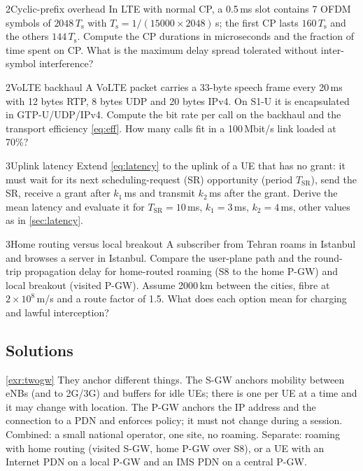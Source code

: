 \documentclass[11pt,a4paper]{article}
\begin{document}
\begin{exercisebox}{2}{Cyclic-prefix overhead}\label{exr:cp}
In LTE with normal CP, a 0.5\,ms slot contains 7 OFDM symbols of $2048\,T_\mathrm{s}$ with
$T_\mathrm{s} = 1/(15000\times2048)$\,s; the first CP lasts $160\,T_\mathrm{s}$ and the others
$144\,T_\mathrm{s}$. Compute the CP durations in microseconds and the fraction of time spent on
CP. What is the maximum delay spread tolerated without inter-symbol interference?
\end{exercisebox}

\begin{exercisebox}{2}{VoLTE backhaul}\label{exr:volte}
A VoLTE packet carries a 33-byte speech frame every 20\,ms with 12 bytes RTP, 8 bytes UDP and
20 bytes IPv4. On S1-U it is encapsulated in GTP-U/UDP/IPv4. Compute the bit rate per call on the
backhaul and the transport efficiency \cref{eq:eff}. How many calls fit in a 100\,Mbit/s link
loaded at 70\%?
\end{exercisebox}

\begin{exercisebox}{3}{Uplink latency}\label{exr:ullat}
Extend \cref{eq:latency} to the uplink of a UE that has no grant: it must wait for its next
scheduling-request (SR) opportunity (period $T_{\mathrm{SR}}$), send the SR, receive a grant after
$k_1$\,ms and transmit $k_2$\,ms after the grant. Derive the mean latency and evaluate it for
$T_{\mathrm{SR}} = 10$\,ms, $k_1 = 3$\,ms, $k_2 = 4$\,ms, other values as in \cref{sec:latency}.
\end{exercisebox}

\begin{exercisebox}{3}{Home routing versus local breakout}\label{exr:roaming}
A subscriber from Tehran roams in Istanbul and browses a server in Istanbul. Compare the user-plane
path and the round-trip propagation delay for home-routed roaming (S8 to the home P-GW) and local
breakout (visited P-GW). Assume 2000\,km between the cities, fibre at $2\times10^8$\,m/s and a route
factor of 1.5. What does each option mean for charging and lawful interception?
\end{exercisebox}

\subsection*{Solutions}

\begin{solutionbox}{\ref{exr:twogw}}
They anchor different things. The S-GW anchors mobility between eNBs (and to 2G/3G) and buffers
for idle UEs; there is one per UE at a time and it may change with location. The P-GW anchors the
IP address and the connection to a PDN and enforces policy; it must not change during a session.
Combined: a small national operator, one site, no roaming. Separate: roaming with home routing
(visited S-GW, home P-GW over S8), or a UE with an Internet PDN on a local P-GW and an IMS PDN
on a central P-GW.
\end{solutionbox}
\end{document}
